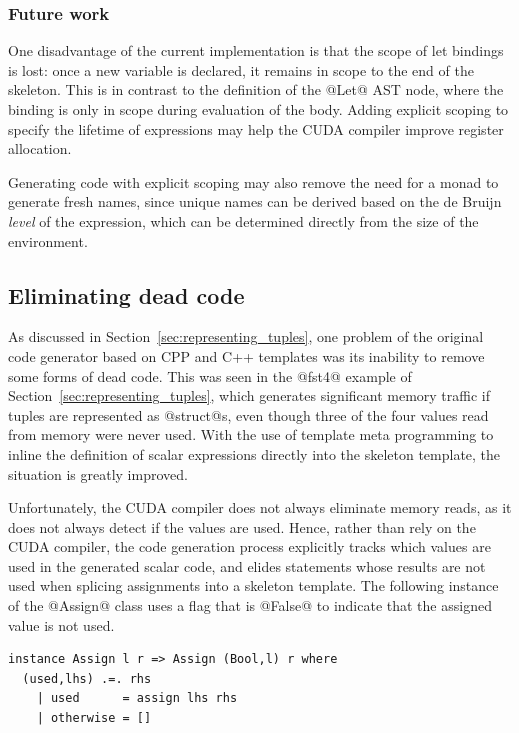 \subsubsection{Future work}

One disadvantage of the current implementation is that the scope of let bindings
is lost: once a new variable is declared, it remains in scope to the end of the
skeleton. This is in contrast to the definition of the @Let@ AST node, where the
binding is only in scope during evaluation of the body. Adding explicit scoping
to specify the lifetime of expressions may help the CUDA compiler improve
register allocation.


Generating code with explicit scoping may also remove the need for a monad to
generate fresh names, since unique names can be derived based on the de Bruijn
\emph{level} of the expression, which can be determined directly from the size
of the environment.


\cg[sharing|)]{}

\subsection{Eliminating dead code}
\label{sec:eliminating_dead_code}

As discussed in Section~\ref{sec:representing_tuples}, one problem of the
original code generator based on CPP and C++ templates was its inability to
remove some forms of dead code. This was seen in the @fst4@ example of
Section~\ref{sec:representing_tuples}, which generates significant memory
traffic if tuples are represented as @struct@s, even though three of the
four values read from memory were never used. With the use of template meta
programming to inline the definition of scalar expressions directly into the
skeleton template, the situation is greatly improved.

Unfortunately, the CUDA compiler does not always eliminate memory reads, as it
does not always detect if the values are used. Hence, rather than rely on the
CUDA compiler, the code generation process explicitly tracks which values are
used in the generated scalar code, and elides statements whose results are not
used when splicing assignments into a skeleton template. The following instance
of the @Assign@ class uses a flag that is @False@ to indicate that the assigned
value is not used.
%
\begin{lstlisting}[style=haskell]
instance Assign l r => Assign (Bool,l) r where
  (used,lhs) .=. rhs
    | used      = assign lhs rhs
    | otherwise = []
\end{lstlisting}

